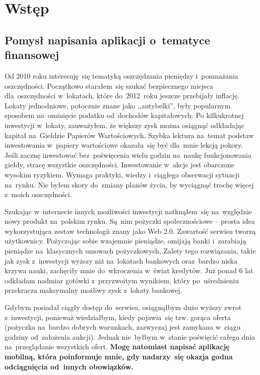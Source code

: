 \documentclass[a4paper,twoside,titlepage,openright]{book}
\begin{document}
\chapter*{Wstęp}

\section*{Pomysł napisania aplikacji o~tematyce finansowej}

Od 2010 roku interesuję~się tematyką oszczędzania pieniędzy i~pomnażania oszczędności. Początkowo starałem~się szukać bezpiecznego miejsca dla~oszczędności w~lokatach, które do~2012~roku jeszcze przebijały inflację. Lokaty jednodniowe, potocznie znane jako ,,antybelki'', były popularnym sposobem na~ominięcie podatku od~dochodów kapitałowych. Po kilkukrotnej inwestycji w~lokaty, zauważyłem, że większy zysk można osiągnąć odkładając kapitał na~Giełdzie Papierów Wartościowych. Szybka lektura na~temat podstaw inwestowania w~papiery wartościowe okazała~się być dla~mnie lekcją pokory. Jeśli zacznę inwestować bez~poświęcenia wielu godzin na~naukę funkcjonowania giełdy, stracę wszystkie oszczędności. Inwestowanie w~akcje jest obarczone wysokim ryzykiem. Wymaga praktyki, wiedzy i~ciągłego obserwacji sytuacji na~rynku. Nie byłem skory do~zmiany planów życia, by wyciągnąć trochę więcej z~moich oszczędności. 

Szukając w~internecie innych możliwości inwestycji natknąłem~się na~względnie nowy produkt na~polskim rynku. Są~nim pożyczki społecznościowe -- prosta idea wykorzystująca zestaw technologii znany jako Web 2.0. Zawartość serwisu tworzą użytkownicy. Pożyczając sobie wzajemnie pieniądze, omijają banki i~zarabiają pieniądze na~klasycznych umowach pożyczkowych. Zalety tego rozwiązania, takie jak zysk z~inwestycji wyższy niż na~lokatach bankowych oraz~bardzo niska krzywa nauki, zachęciły mnie do~wkroczenia w~świat kredytów. Już ponad 6 lat odkładam nadmiar gotówki z~przyzwoitym wynikiem, który po~uśrednieniu przekracza maksymalny możliwy zysk z~lokaty bankowej. 

Gdybym posiadał ciągły dostęp do~serwisu, osiągnąłbym dużo wyższy zwrot z~inwestycji, ponieważ wiedziałbym, kiedy pojawia~się tzw. gorąca oferta (pożyczka na~bardzo dobrych warunkach, zazwyczaj jest zamykana w~ciągu godziny od~założenia aukcji). Jednak nie~byłbym w~stanie poświęcić całego dnia na~przeglądanie wszystkich ofert. \textbf{Mogę natomiast napisać aplikację mobilną, która poinformuje mnie, gdy nadarzy~się okazja godna odciągnięcia od~innych obowiązków.} 
\end{document}
